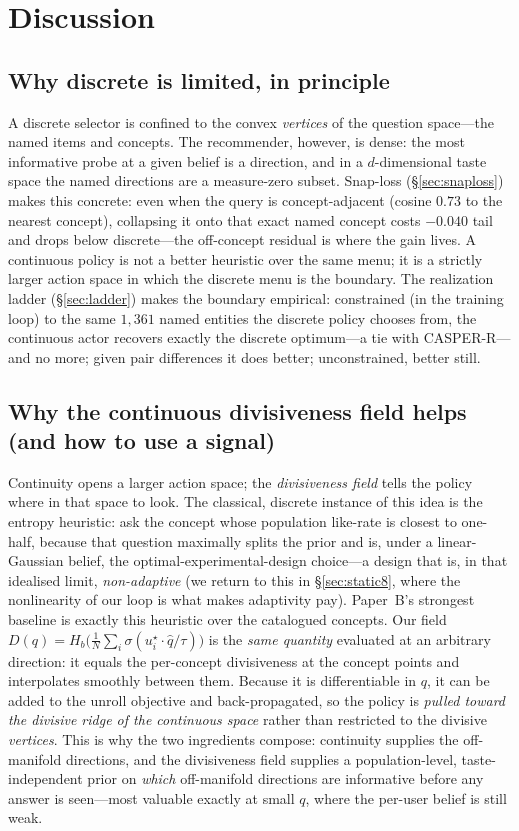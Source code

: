 \documentclass[11pt]{article}
\newcommand{\ustar}{u^{\star}}
\begin{document}
\section{Discussion}\label{sec:discussion}
\subsection{Why discrete is limited, in principle}
A discrete selector is confined to the convex \emph{vertices} of the question space---the named items and concepts. The
recommender, however, is dense: the most informative probe at a given belief is a direction, and in a $d$-dimensional
taste space the named directions are a measure-zero subset. Snap-loss (\S\ref{sec:snaploss}) makes this concrete: even
when the query is concept-adjacent (cosine $0.73$ to the nearest concept), collapsing it onto that exact named concept
costs $-0.040$ tail and drops below discrete---the off-concept residual is where the gain lives. A continuous policy is
not a better heuristic over the same menu; it is a strictly larger action space in which the discrete menu is the
boundary. The realization ladder (\S\ref{sec:ladder}) makes the boundary empirical: constrained (in the training loop)
to the same $1{,}361$ named entities the discrete policy chooses from, the continuous actor recovers exactly the
discrete optimum---a tie with CASPER-R---and no more; given pair differences it does better; unconstrained, better
still.

\subsection{Why the continuous divisiveness field helps (and how to use a signal)}\label{sec:whydiv}
Continuity opens a larger action space; the \emph{divisiveness field} tells the policy where in that space to look. The
classical, discrete instance of this idea is the entropy heuristic: ask the concept whose population like-rate is closest
to one-half, because that question maximally splits the prior and is, under a linear-Gaussian belief, the
optimal-experimental-design choice---a design that is, in that idealised limit, \emph{non-adaptive} (we return to this in
\S\ref{sec:static8}, where the nonlinearity of our loop is what makes adaptivity pay). Paper~B's strongest baseline is
exactly this heuristic over the catalogued concepts.
Our field $D(q)=H_b\!\big(\tfrac1N\sum_i\sigma(\ustar_i\!\cdot\hat q/\tau)\big)$ is the \emph{same quantity} evaluated at
an arbitrary direction: it equals the per-concept divisiveness at the concept points and interpolates smoothly between
them. Because it is differentiable in $q$, it can be added to the unroll objective and back-propagated, so the policy is
\emph{pulled toward the divisive ridge of the continuous space} rather than restricted to the divisive \emph{vertices}.
This is why the two ingredients compose: continuity supplies the off-manifold directions, and the divisiveness field
supplies a population-level, taste-independent prior on \emph{which} off-manifold directions are informative before any
answer is seen---most valuable exactly at small $q$, where the per-user belief is still weak.
\end{document}
